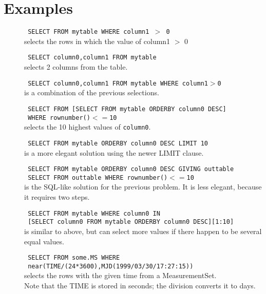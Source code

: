 \section{Examples}
\begin{description}
  \item[] \texttt{ SELECT FROM mytable WHERE column1 $>$ 0 }
    \\selects the rows in which the value of column1 $>$ 0

  \item[] \texttt{ SELECT column0,column1 FROM mytable }
    \\selects 2 columns from the table.

  \item[] \texttt{ SELECT column0,column1 FROM mytable WHERE column1$>$0 }
    \\is a combination of the previous selections.

  \item[] \texttt{ SELECT FROM [SELECT FROM mytable ORDERBY column0 DESC] }
    \\\texttt{ WHERE rownumber()$<=$10 }
    \\selects the 10 highest values of \texttt{column0}.

  \item[] \texttt{ SELECT FROM mytable ORDERBY column0 DESC LIMIT 10 }
    \\is a more elegant solution using the newer LIMIT clause.

  \item[] \texttt{ SELECT FROM mytable ORDERBY column0 DESC GIVING outtable }
    \\\texttt{ SELECT FROM outtable WHERE rownumber()$<=$10 }
    \\is the SQL-like solution for the previous problem.
    It is less elegant, because it requires two steps.

  \item[] \texttt{ SELECT FROM mytable WHERE column0 IN }
    \\\texttt{ [SELECT column0 FROM mytable ORDERBY column0 DESC][1:10] }
    \\is similar to above, but can select more values if there happen
    to be several equal values.

  \item[] \texttt{ SELECT FROM some.MS WHERE }
    \\\texttt{ near(TIME/(24*3600),MJD(1999/03/30/17:27:15)) }
    \\selects the rows with the given time from a MeasurementSet.
    \\Note that the TIME is stored in seconds; the division converts
        it to days.


\end{description}
